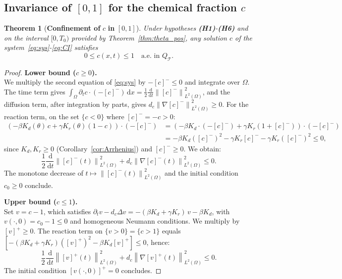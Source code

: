 \documentclass[final,1p,times]{elsarticle}
\newcommand{\dx}{\,\mathrm{d}x}
\numberwithin{equation}{section}
\newtheorem{theorem}{Theorem}[section]
\newcommand{\QT}{Q_{\mathcal{T}}}
\newcommand{\dd}{\,\mathrm{d}}
\newcommand{\dt}{\,\mathrm{d}t}
\newcommand{\norm}[1]{\left\|#1\right\|}
\newcommand{\ppos}[1]{\left[#1\right]^{+}}
\newcommand{\pneg}[1]{\left[#1\right]^{-}}
\newcommand{\ptn}{\partial_t}
\begin{document}
	\subsection{Invariance of $[0,1]$ for the chemical fraction $c$}
	\label{sub:c}
	
	\begin{theorem}[\textbf{Confinement of} $c$ \textbf{in} {$[0,1]$}]
		\label{thm:c_bounds}
		Under hypotheses \textup{\textbf{(H1)}}-\textup{\textbf{(H6)}} and on the interval
		$[0, T_0)$ provided by Theorem~\ref{thm:theta_pos}, any solution $c$ of the
		system~\eqref{eq:sys}-\eqref{eq:CI} satisfies
		\[
		0 \leq c(x,t) \leq 1 \quad\text{a.e. in } \QT.
		\]
	\end{theorem}
	
	\begin{proof}
		\textbf{Lower bound ($c \geq 0$).}\\
		We multiply the second equation of \eqref{eq:sys} by $-\pneg{c} \leq 0$ and integrate
		over $\Omega$. The time term gives
		$\displaystyle\int_\Omega \ptn c\cdot(-\pneg{c})\dx = \frac12\frac{\dd}{\dt}\norm{\pneg{c}}_{L^2(\Omega)}^2$,
		and the diffusion term, after integration by parts, gives
		$d_c\norm{\nabla\pneg{c}}_{L^2(\Omega)}^2 \geq 0$. For the reaction term, on the set
		$\{c < 0\}$ where $\pneg{c} = -c > 0$:
		\begin{align*}
			(-\beta K_d(\theta)\,c + \gamma K_r(\theta)(1-c))\cdot(-\pneg{c})
			&= (-\beta K_d \cdot(-\pneg{c}) + \gamma K_r(1+\pneg{c}))\cdot(-\pneg{c}) \\
			&= -\beta K_d(\pneg{c})^2 - \gamma K_r\pneg{c} - \gamma K_r(\pneg{c})^2 \leq 0,
		\end{align*}
		since $K_d, K_r \geq 0$ (Corollary~\ref{cor:Arrhenius}) and $\pneg{c} \geq 0$. We obtain:
		\[
		\frac12\frac{\dd}{\dt}\norm{\pneg{c}(t)}_{L^2(\Omega)}^2 + d_c\norm{\nabla\pneg{c}(t)}_{L^2(\Omega)}^2 \leq 0.
		\]
		The monotone decrease of $t \mapsto \norm{\pneg{c}(t)}_{L^2(\Omega)}^2$ and the initial condition
		$c_0 \geq 0$ conclude.
		
		\textbf{Upper bound ($c \leq 1$).}\\
		Set $v = c - 1$, which satisfies
		$\ptn v - d_c\Delta v = -(\beta K_d + \gamma K_r)\,v - \beta K_d$,
		with $v(\cdot,0) = c_0 - 1 \leq 0$ and homogeneous Neumann conditions. We multiply by $\ppos{v} \geq 0$.
		The reaction term on $\{v > 0\} = \{c > 1\}$ equals
		$[-(\beta K_d+\gamma K_r)(\ppos{v})^2 - \beta K_d \ppos{v}] \leq 0$, hence:
		\[
		\frac12\frac{\dd}{\dt}\norm{\ppos{v}(t)}_{L^2(\Omega)}^2 + d_c\norm{\nabla\ppos{v}(t)}_{L^2(\Omega)}^2 \leq 0.
		\]
		The initial condition $\ppos{v(\cdot,0)} = 0$ concludes.
	\end{proof}
	
\end{document}
